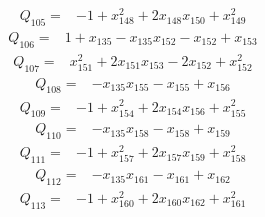 \begin{equation*}\begin{aligned}
Q_{105}={}& -1+x_{148}^{2}+2x_{148}x_{150}+x_{149}^{2}
\end{aligned}\end{equation*}
\begin{equation*}\begin{aligned}
Q_{106}={}& 1+x_{135}-x_{135}x_{152}-x_{152}+x_{153}
\end{aligned}\end{equation*}
\begin{equation*}\begin{aligned}
Q_{107}={}& x_{151}^{2}+2x_{151}x_{153}-2x_{152}+x_{152}^{2}
\end{aligned}\end{equation*}
\begin{equation*}\begin{aligned}
Q_{108}={}& -x_{135}x_{155}-x_{155}+x_{156}
\end{aligned}\end{equation*}
\begin{equation*}\begin{aligned}
Q_{109}={}& -1+x_{154}^{2}+2x_{154}x_{156}+x_{155}^{2}
\end{aligned}\end{equation*}
\begin{equation*}\begin{aligned}
Q_{110}={}& -x_{135}x_{158}-x_{158}+x_{159}
\end{aligned}\end{equation*}
\begin{equation*}\begin{aligned}
Q_{111}={}& -1+x_{157}^{2}+2x_{157}x_{159}+x_{158}^{2}
\end{aligned}\end{equation*}
\begin{equation*}\begin{aligned}
Q_{112}={}& -x_{135}x_{161}-x_{161}+x_{162}
\end{aligned}\end{equation*}
\begin{equation*}\begin{aligned}
Q_{113}={}& -1+x_{160}^{2}+2x_{160}x_{162}+x_{161}^{2}
\end{aligned}\end{equation*}
